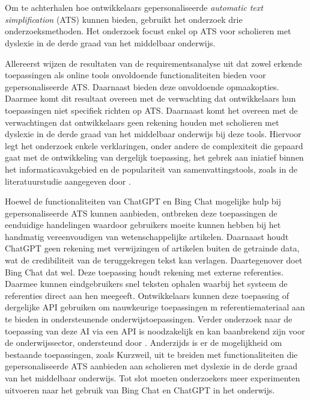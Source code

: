 
\chapter{}%
\label{ch:discussie}

Om te achterhalen hoe ontwikkelaars gepersonaliseerde \textit{automatic text simplification} (ATS) kunnen bieden, gebruikt het onderzoek drie onderzoeksmethoden. Het onderzoek focust enkel op ATS voor scholieren met dyslexie in de derde graad van het middelbaar onderwijs.

\medspace

Allereerst wijzen de resultaten van de requirementsanalyse uit dat zowel erkende toepassingen als online tools onvoldoende functionaliteiten bieden voor gepersonaliseerde ATS. Daarnaast bieden deze onvoldoende opmaakopties. Daarmee komt dit resultaat overeen met de verwachting dat ontwikkelaars hun toepassingen niet specifiek richten op ATS. Daarnaast komt het overeen met de verwachtingen dat ontwikkelaars geen rekening houden met scholieren met dyslexie in de derde graad van het middelbaar onderwijs bij deze tools. Hiervoor legt het onderzoek enkele verklaringen, onder andere de complexiteit die gepaard gaat met de ontwikkeling van dergelijk toepassing, het gebrek aan iniatief binnen het informaticavakgebied en de populariteit van samenvattingstools, zoals in de literatuurstudie aangegeven door \textcite{Gooding2022}.

\medspace

Hoewel de functionaliteiten van ChatGPT en Bing Chat mogelijke hulp bij gepersonaliseerde ATS kunnen aanbieden, ontbreken deze toepassingen de eenduidige handelingen waardoor gebruikers moeite kunnen hebben bij het handmatig vereenvoudigen van wetenschappelijke artikelen. Daarnaast houdt ChatGPT geen rekening met verwijzingen of artikelen buiten de getrainde data, wat de credibiliteit van de teruggekregen tekst kan verlagen. Daartegenover doet Bing Chat dat wel. Deze toepassing houdt rekening met externe referenties. Daarmee kunnen eindgebruikers snel teksten ophalen waarbij het systeem de referenties direct aan hen meegeeft. Ontwikkelaars kunnen deze toepassing of dergelijke API gebruiken om nauwkeurige toepassingen m referentiemateriaal aan te bieden in ondersteunende onderwijstoepassingen. Verder onderzoek naar de toepassing van deze AI via een API is noodzakelijk en kan baanbrekend zijn voor de onderwijssector, ondersteund door \textcite{Roose2023, Garg2022}. Anderzijds is er de mogelijkheid om bestaande toepassingen, zoals Kurzweil, uit te breiden met functionaliteiten die gepersonaliseerde ATS aanbieden aan scholieren met dyslexie in de derde graad van het middelbaar onderwijs. Tot slot moeten onderzoekers meer experimenten uitvoeren naar het gebruik van Bing Chat en ChatGPT in het onderwijs. 

